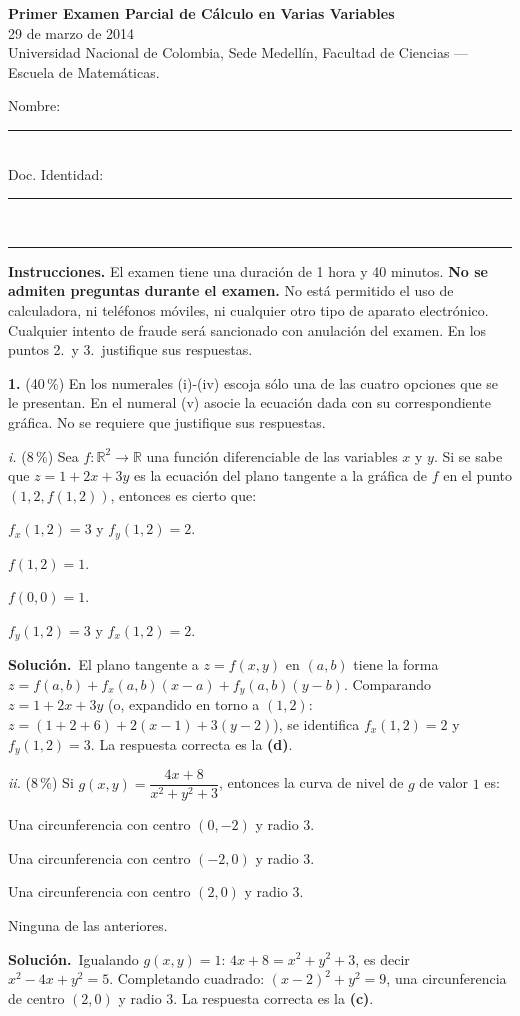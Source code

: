 \documentclass[11pt]{article}
\newcommand{\sol}{\medskip\noindent\textbf{\textcolor{solgreen}{Soluci\'on.}}\ }
\newcommand{\examheader}{%
  \noindent
  \begin{minipage}[t]{0.62\linewidth}
    {\bfseries\large Primer Examen Parcial de C\'alculo en Varias Variables}\\
    {\small 29 de marzo de 2014}\\
    {\small Universidad Nacional de Colombia, Sede Medell\'in, Facultad de Ciencias --- Escuela de Matem\'aticas.}
  \end{minipage}%
  \hfill
  \begin{minipage}[t]{0.33\linewidth}
    \raggedleft\small
    Nombre: \rule{2.8cm}{0.4pt}\\[4pt]
    Doc. Identidad: \rule{2.5cm}{0.4pt}
  \end{minipage}\\[4pt]
  \rule{\linewidth}{0.6pt}
}
\begin{document}
\examheader

\textbf{Instrucciones.} El examen tiene una duraci\'on de 1 hora y 40 minutos. \textbf{No se admiten preguntas durante el examen.} No est\'a permitido el uso de calculadora, ni tel\'efonos m\'oviles, ni cualquier otro tipo de aparato electr\'onico. Cualquier intento de fraude ser\'a sancionado con anulaci\'on del examen. En los puntos 2.\ y 3.\ justifique sus respuestas.

\bigskip
\noindent\textbf{1.} (40\,\%) En los numerales (i)-(iv) escoja s\'olo una de las cuatro opciones que se le presentan. En el numeral (v) asocie la ecuaci\'on dada con su correspondiente gr\'afica. No se requiere que justifique sus respuestas.

\medskip
\noindent\textit{i.} (8\,\%) Sea $f:\mathbb{R}^2\to\mathbb{R}$ una funci\'on diferenciable de las variables $x$ y $y$. Si se sabe que $z=1+2x+3y$ es la ecuaci\'on del plano tangente a la gr\'afica de $f$ en el punto $(1,2,f(1,2))$, entonces es cierto que:

\begin{opciones}
  \item $f_x(1,2)=3$ y $f_y(1,2)=2$.
  \item $f(1,2)=1$.
  \item $f(0,0)=1$.
  \item $f_y(1,2)=3$ y $f_x(1,2)=2$.
\end{opciones}

\sol El plano tangente a $z=f(x,y)$ en $(a,b)$ tiene la forma $z=f(a,b)+f_x(a,b)(x-a)+f_y(a,b)(y-b)$. Comparando $z=1+2x+3y$ (o, expandido en torno a $(1,2)$: $z=(1+2+6)+2(x-1)+3(y-2)$), se identifica $f_x(1,2)=2$ y $f_y(1,2)=3$. La respuesta correcta es la \textbf{(d)}.

\medskip
\noindent\textit{ii.} (8\,\%) Si $g(x,y)=\dfrac{4x+8}{x^2+y^2+3}$, entonces la curva de nivel de $g$ de valor $1$ es:

\begin{opciones}
  \item Una circunferencia con centro $(0,-2)$ y radio $3$.
  \item Una circunferencia con centro $(-2,0)$ y radio $3$.
  \item Una circunferencia con centro $(2,0)$ y radio $3$.
  \item Ninguna de las anteriores.
\end{opciones}

\sol Igualando $g(x,y)=1$: $4x+8=x^2+y^2+3$, es decir $x^2-4x+y^2=5$. Completando cuadrado: $(x-2)^2+y^2=9$, una circunferencia de centro $(2,0)$ y radio $3$. La respuesta correcta es la \textbf{(c)}.
\end{document}
